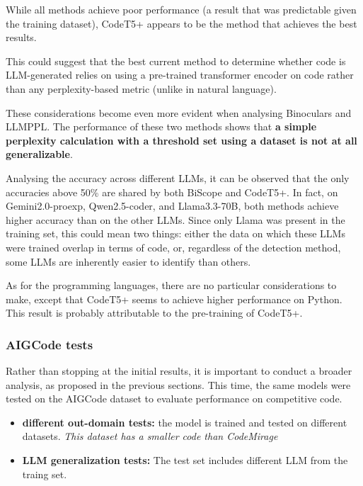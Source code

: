 While all methods achieve 
poor performance (a result that was predictable given the training dataset), 
CodeT5+ appears to be the method that achieves the best results. 

This could suggest that the best current method to determine whether code is 
LLM-generated relies on using a pre-trained transformer encoder on code rather 
than any perplexity-based metric (unlike in natural language).

These considerations become even more evident when analysing Binoculars and LLMPPL. 
The performance of these two methods shows that \textbf{a simple perplexity calculation with a 
threshold set using a dataset is not at all generalizable}.

Analysing the accuracy across different LLMs, it can be observed that the only 
accuracies above 50\% are shared by both BiScope and CodeT5+. In fact, on Gemini2.0-proexp, 
Qwen2.5-coder, and Llama3.3-70B, both methods achieve higher accuracy than on the other 
LLMs. Since only Llama was present in the training set, this could mean two things: 
either the data on which these LLMs were trained overlap in terms of code, or, 
regardless of the detection method, some LLMs are inherently easier to identify than others.

As for the programming languages, there are no particular considerations to make, 
except that CodeT5+ seems to achieve higher performance on Python. This result is 
probably attributable to the pre-training of CodeT5+.


\clearpage
\subsubsection{AIGCode tests}
Rather than stopping at the initial results, it is important to conduct a broader analysis, 
as proposed in the previous sections. 
This time, the same models were tested on the AIGCode dataset to evaluate performance on competitive code.
\begin{itemize}
\item \textbf{different out-domain tests:} the model is trained and tested on different datasets. \textit{This dataset has a smaller code than CodeMirage}
\item \textbf{LLM generalization tests:} The test set includes different LLM from the traing set.
\end{itemize}

